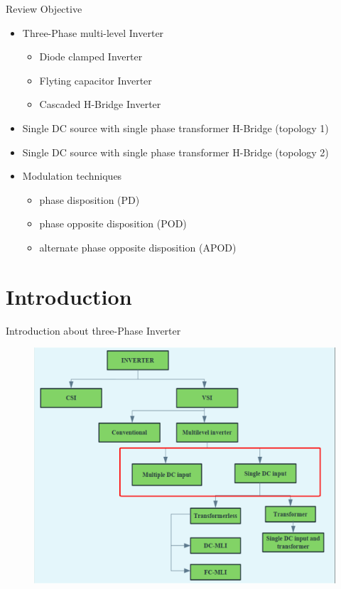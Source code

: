\documentclass[
	11pt, %
]{beamer}
\begin{document}
\begin{frame}{Review Objective}
	\begin{itemize}
		\setlength{\itemsep}{10pt}
		\footnotesize
		\item {Three-Phase multi-level Inverter}
		\begin{itemize}
			\setlength{\itemsep}{10pt}
			\footnotesize
			\item{Diode clamped Inverter}
			\item{Flyting capacitor Inverter}
			\item{Cascaded H-Bridge Inverter}
		\end{itemize}
		\item{Single DC source with single phase transformer H-Bridge (topology 1)}
		\item{Single DC source with single phase transformer H-Bridge (topology 2)}
		\item{Modulation techniques}
		\begin{itemize}
			\setlength{\itemsep}{10pt}
			\footnotesize
			\item {phase disposition (PD)}
			\item {phase opposite disposition (POD)}
			\item {alternate phase opposite disposition (APOD)}
		\end{itemize}
	\end{itemize}
\end{frame}



\section{Introduction}
\begin{frame}{Introduction about three-Phase Inverter}
	\begin{figure}
		\includegraphics[width=0.7\linewidth]{introthreephaseinverter.png}
	\end{figure}
\end{frame}
\end{document}
